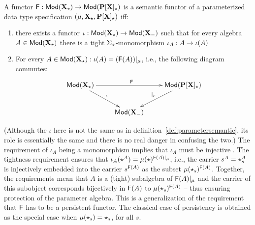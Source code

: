 \begin{fact}\label{fa:parsemAlt}
A functor ${\sf {F}}: {\sf {Mod}}({\bf X_\star}) \to {\sf {Mod}}({\bf P[X]_\star})$ is a
semantic functor of a parameterized data type specification
$(\mu,{\bf X_\star},{\bf P[X]_\star})$ iff:
\begin{enumerate}
\item there exists a functor ${\sf {\iota}}:{\sf {Mod}}({\bf X_\star}) \to
{\sf {Mod}}({\bf X_{-}})$ such that for every algebra $A \in
{\sf {Mod}}({\bf X_\star})$ there is a tight $\Sigma_\star$-monomorphism ${\sf {\iota}}_A: A \to \iota(A)$
\item For every $A\in{\sf {Mod}}({\bf X_\star}): \iota(A) =
({\sf {F}}(A))|_\mu$, i.e., 
the following diagram commutes:
\[ \xymatrix{
	\Mod(\thr{X_\cons}) \ar[rr]^{\fu{F}} \ar[rd]^{\iota}
			&& \Mod(\thr{P[X]_\cons}) \ar[ld]_{|_\mu} \\
		& \Mod(\thr{X_{\weak}}) \\
								}
\]
	\end{enumerate}
\end{fact}
(Although the $\iota$ here is not the same as in
definition~\ref{def:parametersemantic}, its role is essentially the same and
there is no real danger in confusing the two.)
The requirement of $\iota_A$ being a monomorphism implies that $\iota_A$ must
be injective \cite{catrel}. The tightness requirement ensures that
$\iota_A(\star^A)= \mu(\star)^{{\sf {F}}(A) |_{\mu}}$, i.e., the carrier
$s^A=\star_s^A$ is injectively embedded into the carrier $s^{{\sf {F}}(A)}$ as the subset
$\mu(\star_s)^{{\sf {F}}(A)}$. Together, the requirements mean that 
$A$ is a (tight) subalgebra of
${\sf {F}}(A)|_{\mu}$ and the carrier of this subobject corresponds bijectively in ${\sf {F}}(A)$ to
$\mu(\star_s)^{{\sf {F}}(A)}$ -- thus ensuring
protection of the parameter algebra. This is a generalization of the
requirement that ${\sf {F}}$ has to be a persistent functor. The
classical case of persistency is obtained as the special case when $\mu(\star_s)= \star_s$, for all $s$.


